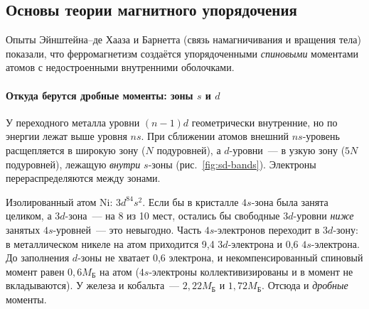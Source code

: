 \subsection{Основы теории магнитного упорядочения}\label{ssec:exchange}

Опыты Эйнштейна--де Хааза и Барнетта (связь намагничивания и вращения
тела) показали, что ферромагнетизм создаётся упорядоченными
\emph{спиновыми} моментами атомов с недостроенными внутренними
оболочками.

\paragraph{Откуда берутся дробные моменты: зоны $s$ и $d$}
У переходного металла уровни $(n-1)d$ геометрически внутренние, но по
энергии лежат выше уровня $ns$. При сближении атомов внешний $ns$-уровень
расщепляется в широкую зону ($N$ подуровней), а $d$-уровни~— в узкую
зону ($5N$ подуровней), лежащую \emph{внутри} $s$-зоны
(рис.~\ref{fig:sd-bands}). Электроны перераспределяются между зонами.

\begin{primer}
Изолированный атом Ni: $3d^84s^2$. Если бы в кристалле $4s$-зона была
занята целиком, а $3d$-зона~— на 8 из 10 мест, остались бы свободные
$3d$-уровни \emph{ниже} занятых $4s$-уровней~— это невыгодно. Часть
$4s$-электронов переходит в $3d$-зону: в металлическом никеле на атом
приходится 9,4 $3d$-электрона и 0,6 $4s$-электрона. До заполнения
$d$-зоны не хватает 0,6 электрона, и некомпенсированный спиновый момент
равен $0{,}6M_\text{Б}$ на атом ($4s$-электроны коллективизированы и в
момент не вкладываются). У железа и кобальта~— $2{,}22M_\text{Б}$ и
$1{,}72M_\text{Б}$. Отсюда и \emph{дробные} моменты.
\end{primer}

